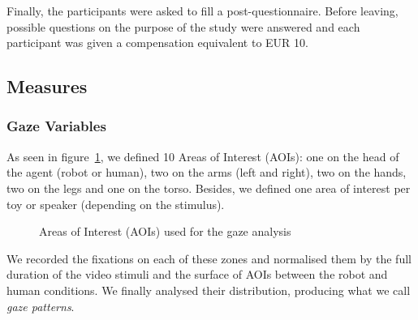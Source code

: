 \documentclass[lettersize, noapacite, twoside, HRI]{apa_HRI}
\begin{document}
Finally, the participants were asked to fill a post-questionnaire.
Before leaving, possible questions on the purpose of the study were
answered and each participant was given a compensation equivalent to EUR 10.

\subsection{Measures}

\subsubsection{Gaze Variables}

As seen in figure~\ref{fig:aoi}, we defined 10 Areas of Interest (AOIs): one on
the head of the agent (robot or human), two on the arms (left and right), two on
the hands, two on the legs and one on the torso. Besides, we defined one area of
interest per toy or speaker (depending on the stimulus).

\begin{figure}
    \centering

    \caption{Areas of Interest (AOIs) used for the gaze analysis}
    \label{fig:aoi}
\end{figure}

We recorded the fixations on each of these zones and normalised them by
the full duration of the video stimuli and the surface of AOIs between the robot
and human conditions. We finally analysed their distribution, producing what we call \emph{gaze
patterns}.
\end{document}
